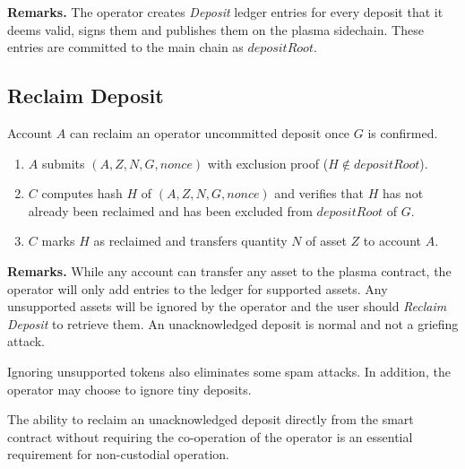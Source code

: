 \documentclass[12pt,a4paper]{article}
\begin{document}
\textbf{Remarks.} 
The operator creates \emph{Deposit} ledger entries for every deposit that it deems valid, signs them and publishes them on the plasma sidechain. These entries are committed to the main chain as $depositRoot$.

\subsection{Reclaim Deposit}\label{gp:reclaim}
Account $A$ can reclaim an operator uncommitted deposit once $G$ is confirmed.
\begin{mdframed}
\begin{enumerate}
    \item $A$ submits \((A, Z, N, G, nonce)\) with exclusion proof (\(H \notin depositRoot\)).
    \item $C$ computes hash $H$ of \((A, Z, N, G, nonce)\) and verifies that $H$ has not already been reclaimed and has been excluded from $depositRoot$ of $G$.
    \item $C$ marks $H$ as reclaimed and transfers quantity $N$ of asset $Z$ to account $A$.
\end{enumerate}
\end{mdframed}

\textbf{Remarks.}
While any account can transfer any asset to the plasma contract, the operator will only add entries to the ledger for supported assets. Any unsupported assets will be ignored by the operator and the user should \emph{Reclaim Deposit} to retrieve them. An unacknowledged deposit is normal and not a griefing attack. 

Ignoring unsupported tokens also eliminates some spam attacks. In addition, the operator may choose to ignore tiny deposits.

The ability to reclaim an unacknowledged deposit directly from the smart contract without requiring the co-operation of the operator is an essential requirement for non-custodial operation.
\end{document}
